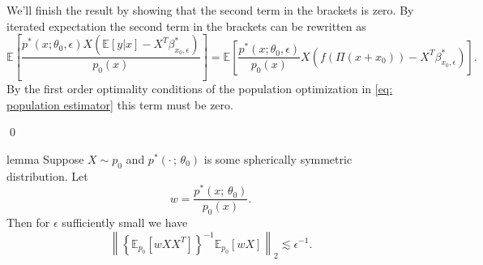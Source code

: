 \documentclass[11pt]{article}
\begin{document}
We'll finish the result by showing that the second term in the brackets is zero. By iterated expectation the second term in the brackets can be rewritten as 
\begin{equation*}
    \mathbb{E}\left[\frac{p^*(x;\theta_0, \epsilon) X\left(\mathbb{E}[y|x] - X^T\beta^*_{x_0, \epsilon}\right)}{p_0(x)}\right] = \mathbb{E}\left[\frac{p^*(x;\theta_0, \epsilon)}{p_0(x)} X\left(f(\Pi(x+x_0)) - X^T\beta^*_{x_0, \epsilon}\right)\right].
\end{equation*}
By the first order optimality conditions of the population optimization in \cref{eq: population estimator} this term must be zero. 

\qed{}

\begin{restatable}{lemma}{} \label{lemma: pnorm bound} Suppose $X\sim p_0$ and $p^*(\cdot\,;\, \theta_0)$ is some spherically symmetric distribution. Let
\[w =  \frac{p^*(x;\,\theta_0)}{p_0(x)}.\]
Then for $\epsilon$ sufficiently small we have
\begin{equation}
   \left\|\left\{\mathbb{E}_{p_{0}}[wXX^{T}]\right\}^{-1}\mathbb{E}_{p_{0}}[wX]\right\|_2 \lesssim \epsilon^{-1}.
\end{equation}
\end{restatable}
\end{document}
